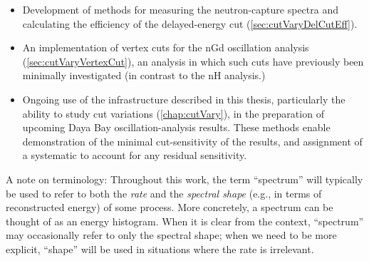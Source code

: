 \documentclass[../thesis.tex]{subfiles}
\begin{document}
\begin{itemize}
  \item Development of methods for measuring the neutron-capture spectra and calculating the efficiency of the delayed-energy cut (\autoref{sec:cutVaryDelCutEff}).
  \item An implementation of vertex cuts for the nGd oscillation analysis (\autoref{sec:cutVaryVertexCut}), an analysis in which such cuts have previously been minimally investigated (in contrast to the nH analysis.)
  \item Ongoing use of the infrastructure described in this thesis, particularly the ability to study cut variations (\autoref{chap:cutVary}), in the preparation of upcoming Daya Bay oscillation-analysis results. These methods enable demonstration of the minimal cut-sensitivity of the results, and assignment of a systematic to account for any residual sensitivity.
\end{itemize}

A note on terminology: Throughout this work, the term ``spectrum'' will typically be used to refer to both the \emph{rate} and the \emph{spectral shape} (e.g., in terms of reconstructed energy) of some process. More concretely, a spectrum can be thought of as an energy histogram. When it is clear from the context, ``spectrum'' may occasionally refer to only the spectral shape; when we need to be more explicit, ``shape'' will be used in situations where the rate is irrelevant.
\end{document}

